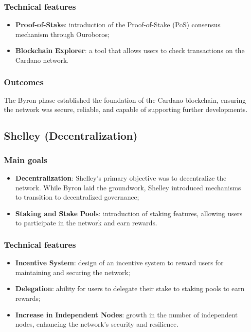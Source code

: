 \subsubsection*{Technical features}
\begin{itemize}
    \item \textbf{Proof-of-Stake}: introduction of the Proof-of-Stake (PoS) 
        consensus mechanism through Ouroboros;
    \item \textbf{Blockchain Explorer}: a tool that allows users to check 
        transactions on the Cardano network.
\end{itemize}

\subsubsection*{Outcomes}
The Byron phase established the foundation of the Cardano blockchain, ensuring 
the network was secure, reliable, and capable of supporting further developments.

\vspace{0.5cm}

\subsection{Shelley (Decentralization)}

\subsubsection*{Main goals}
\begin{itemize}
    \item \textbf{Decentralization}: Shelley’s primary objective was to decentralize 
        the network. While Byron laid the groundwork, Shelley introduced mechanisms to 
        transition to decentralized governance;
    \item \textbf{Staking and Stake Pools}: introduction of staking features, allowing 
        users to participate in the network and earn rewards.
\end{itemize}

\subsubsection*{Technical features}
\begin{itemize}
    \item \textbf{Incentive System}: design of an incentive system to reward 
        users for maintaining and securing the network;
    \item \textbf{Delegation}: ability for users to delegate their stake to staking 
        pools to earn rewards;
    \item \textbf{Increase in Independent Nodes}: growth in the number of independent 
        nodes, enhancing the network's security and resilience.
\end{itemize}

